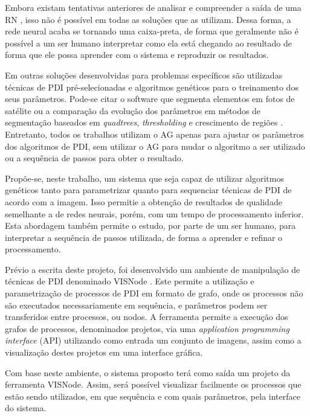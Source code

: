 \documentclass[12pt,oneside,a4paper,english,french,spanish,brazil,]{abntex2}
\begin{document}
Embora existam tentativas anteriores de analisar e compreender a saída de uma RN \cite{zeiler:2014}, isso não é possível em todas as soluções que as utilizam. Dessa forma, a rede neural acaba se tornando uma caixa-preta, de forma que geralmente não é possível a um ser humano interpretar como ela está chegando ao resultado de forma que ele possa aprender com o sistema e reproduzir os resultados.

Em outras soluções desenvolvidas para problemas específicos são utilizadas técnicas de PDI pré-selecionadas e algoritmos genéticos \cite{holland:1992} para o treinamento dos seus parâmetros. Pode-se citar o software que segmenta elementos em fotos de satélite \cite{costa:2010} ou a comparação da evolução dos parâmetros em métodos de segmentação baseados em \textit{quadtrees}, \textit{thresholding} e crescimento de regiões \cite{matias:2007}. Entretanto, todos os trabalhos utilizam o AG apenas para ajustar os parâmetros dos algoritmos de PDI, sem utilizar o AG para mudar o algoritmo a ser utilizado ou a sequência de passos para obter o resultado.

Propõe-se, neste trabalho, um sistema que seja capaz de utilizar algoritmos genéticos tanto para parametrizar quanto para sequenciar técnicas de PDI de acordo com a imagem. Isso permitie a obtenção de resultados de qualidade semelhante a de redes neurais, porém, com um tempo de processamento inferior. Esta abordagem também permite o estudo, por parte de um ser humano, para interpretar a sequência de passos utilizada, de forma a aprender e refinar o processamento.

Prévio a escrita deste projeto, foi desenvolvido um ambiente de manipulação de técnicas de PDI denominado VISNode \cite{visnode:2018}. Este permite a utilização e parametrização de processos de PDI em formato de grafo, onde os processos não são executados necessariamente em sequência, e parâmetros podem ser transferidos entre processos, ou nodos. A ferramenta permite a execução dos grafos de processos, denominados projetos, via uma \textit{application programming interface} (API) utilizando como entrada um conjunto de imagens, assim como a visualização destes projetos em uma interface gráfica.

Com base neste ambiente, o sistema proposto terá como saída um projeto da ferramenta VISNode. Assim, será possível visualizar facilmente os processos que estão sendo utilizados, em que sequência e com quais parâmetros, pela interface do sistema.
\end{document}
